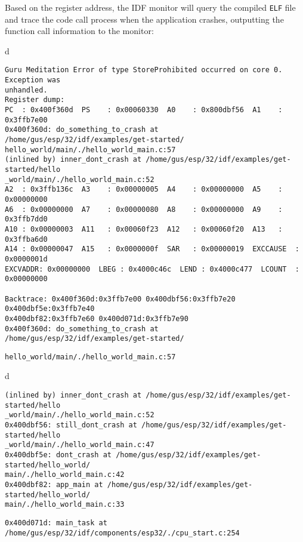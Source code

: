 \documentclass[a4paper,12pt]{book}
\begin{document}
Based on the register address, the IDF monitor will query the compiled \verb|ELF| file and trace the code call process when the application crashes, outputting the function call information to the monitor:

\begin{codebloc}
\begin{tabular}{d}
\vspace{2pt}
\begin{verbatim}
Guru Meditation Error of type StoreProhibited occurred on core 0. Exception was 
unhandled.
Register dump:
PC  : 0x400f360d  PS    : 0x00060330  A0    : 0x800dbf56  A1    : 0x3ffb7e00
0x400f360d: do_something_to_crash at /home/gus/esp/32/idf/examples/get-started/
hello_world/main/./hello_world_main.c:57
(inlined by) inner_dont_crash at /home/gus/esp/32/idf/examples/get-started/hello
_world/main/./hello_world_main.c:52
A2  : 0x3ffb136c  A3    : 0x00000005  A4    : 0x00000000  A5    : 0x00000000
A6  : 0x00000000  A7    : 0x00000080  A8    : 0x00000000  A9    : 0x3ffb7dd0
A10 : 0x00000003  A11   : 0x00060f23  A12   : 0x00060f20  A13   : 0x3ffba6d0
A14 : 0x00000047  A15   : 0x0000000f  SAR   : 0x00000019  EXCCAUSE  : 0x0000001d
EXCVADDR: 0x00000000  LBEG : 0x4000c46c  LEND : 0x4000c477  LCOUNT  : 0x00000000

Backtrace: 0x400f360d:0x3ffb7e00 0x400dbf56:0x3ffb7e20 0x400dbf5e:0x3ffb7e40 
0x400dbf82:0x3ffb7e60 0x400d071d:0x3ffb7e90
0x400f360d: do_something_to_crash at /home/gus/esp/32/idf/examples/get-started/ 
\end{verbatim}
\verb|hello_world/main/./hello_world_main.c:57|
\end{tabular}
\end{codebloc}

\begin{codebloc}
\begin{tabular}{d}
\vspace{2pt}
\begin{verbatim}
(inlined by) inner_dont_crash at /home/gus/esp/32/idf/examples/get-started/hello
_world/main/./hello_world_main.c:52
0x400dbf56: still_dont_crash at /home/gus/esp/32/idf/examples/get-started/hello
_world/main/./hello_world_main.c:47
0x400dbf5e: dont_crash at /home/gus/esp/32/idf/examples/get-started/hello_world/
main/./hello_world_main.c:42
0x400dbf82: app_main at /home/gus/esp/32/idf/examples/get-started/hello_world/
main/./hello_world_main.c:33
\end{verbatim}
\verb|0x400d071d: main_task at /home/gus/esp/32/idf/components/esp32/./cpu_start.c:254|
\end{tabular}
\end{codebloc}
\end{document}
